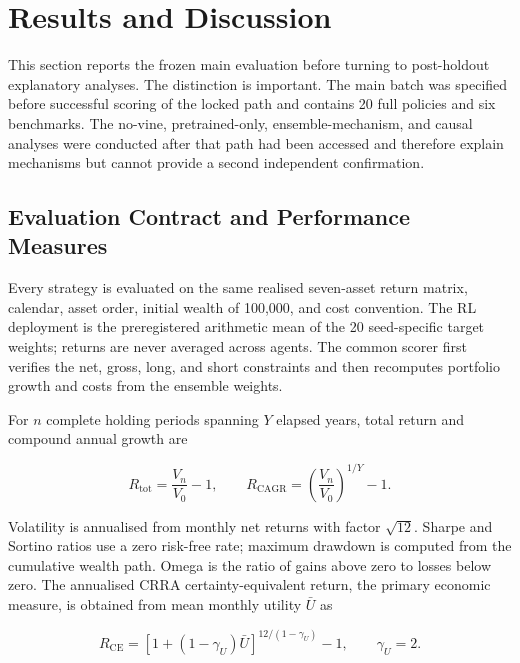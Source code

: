 \section{Results and Discussion}
\label{sec:results}

This section reports the frozen main evaluation before turning to post-holdout explanatory analyses. The distinction is important. The main batch was specified before successful scoring of the locked path and contains 20 full policies and six benchmarks. The no-vine, pretrained-only, ensemble-mechanism, and causal analyses were conducted after that path had been accessed and therefore explain mechanisms but cannot provide a second independent confirmation.

\subsection{Evaluation Contract and Performance Measures}
\label{subsec:4_evaluation_contract}

Every strategy is evaluated on the same realised seven-asset return matrix, calendar, asset order, initial wealth of 100,000, and cost convention. The RL deployment is the preregistered arithmetic mean of the 20 seed-specific target weights; returns are never averaged across agents. The common scorer first verifies the net, gross, long, and short constraints and then recomputes portfolio growth and costs from the ensemble weights.

For $n$ complete holding periods spanning $Y$ elapsed years, total return and compound annual growth are

\begin{equation}
R_{\mathrm{tot}}=\frac{V_n}{V_0}-1,
\qquad
R_{\mathrm{CAGR}}=\left(\frac{V_n}{V_0}\right)^{1/Y}-1.
\label{eq:annualized_return}
\end{equation}

Volatility is annualised from monthly net returns with factor $\sqrt{12}$. Sharpe and Sortino ratios use a zero risk-free rate; maximum drawdown is computed from the cumulative wealth path. Omega is the ratio of gains above zero to losses below zero. The annualised CRRA certainty-equivalent return, the primary economic measure, is obtained from mean monthly utility $\bar U$ as

\begin{equation}
R_{\mathrm{CE}}=\left[1+(1-\gamma_U)\bar U\right]^{12/(1-\gamma_U)}-1,
\qquad \gamma_U=2.
\label{eq:realized_utility}
\end{equation}

